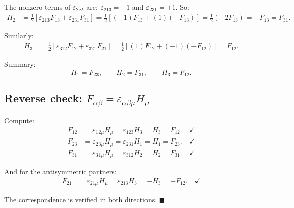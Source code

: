 \documentclass[12pt]{article}
\begin{document}
The nonzero terms of $\varepsilon_{2\nu\lambda}$ are: $\varepsilon_{213} = -1$ and $\varepsilon_{231} = +1$. So:
\begin{align}
H_2 &= \tfrac{1}{2}[\varepsilon_{213}F_{13} + \varepsilon_{231}F_{31}] = \tfrac{1}{2}[(-1)F_{13} + (1)(-F_{13})] = \tfrac{1}{2}(-2F_{13}) = -F_{13} = F_{31}.
\end{align}

Similarly:
\begin{align}
H_3 &= \tfrac{1}{2}[\varepsilon_{312}F_{12} + \varepsilon_{321}F_{21}] = \tfrac{1}{2}[(1)F_{12} + (-1)(-F_{12})] = F_{12}.
\end{align}

Summary:
\[
\boxed{H_1 = F_{23}, \qquad H_2 = F_{31}, \qquad H_3 = F_{12}}.
\]

\subsection*{Reverse check: $F_{\alpha\beta} = \varepsilon_{\alpha\beta\mu}H_\mu$}

Compute:
\begin{align}
F_{12} &= \varepsilon_{12\mu}H_\mu = \varepsilon_{123}H_3 = H_3 = F_{12}. \quad \checkmark \\
F_{23} &= \varepsilon_{23\mu}H_\mu = \varepsilon_{231}H_1 = H_1 = F_{23}. \quad \checkmark \\
F_{31} &= \varepsilon_{31\mu}H_\mu = \varepsilon_{312}H_2 = H_2 = F_{31}. \quad \checkmark
\end{align}

And for the antisymmetric partners:
\begin{align}
F_{21} &= \varepsilon_{21\mu}H_\mu = \varepsilon_{213}H_3 = -H_3 = -F_{12}. \quad \checkmark
\end{align}

The correspondence is verified in both directions. \hfill $\blacksquare$
\end{document}
